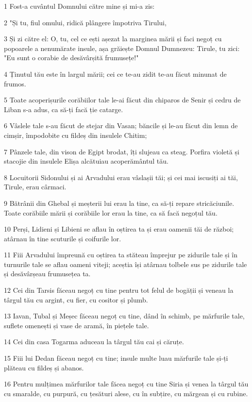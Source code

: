 \par 1 Fost-a cuvântul Domnului către mine și mi-a zis:
\par 2 "Și tu, fiul omului, ridică plângere împotriva Tirului,
\par 3 Și zi către el: O, tu, cel ce ești așezat la marginea mării și faci negoț cu popoarele a nenumărate insule, așa grăiește Domnul Dumnezeu: Tirule, tu zici: "Eu sunt o corabie de desăvârșită frumusețe!"
\par 4 Ținutul tău este în largul mării; cei ce te-au zidit te-au făcut minunat de frumos.
\par 5 Toate acoperișurile corăbiilor tale le-ai făcut din chiparos de Senir și cedru de Liban s-a adus, ca să-ți facă ție catarge.
\par 6 Vâslele tale s-au făcut de stejar din Vasan; băncile și le-au făcut din lemn de cimșir, împodobite cu fildeș din insulele Chitim;
\par 7 Pânzele tale, din vison de Egipt brodat, îți slujeau ca steag. Porfira violetă și stacojie din insulele Elișa alcătuiau acoperământul tău.
\par 8 Locuitorii Sidonului și ai Arvadului erau vâslașii tăi; și cei mai iscusiți ai tăi, Tirule, erau cârmaci.
\par 9 Bătrânii din Ghebal și meșterii lui erau la tine, ca să-ți repare stricăciunile. Toate corăbiile mării și corăbiile lor erau la tine, ca să facă negoțul tău.
\par 10 Perși, Lidieni și Libieni se aflau în oștirea ta și erau oamenii tăi de război; atârnau în tine scuturile și coifurile lor.
\par 11 Fiii Arvadului împreună cu oștirea ta stăteau împrejur pe zidurile tale și în turnurile tale se aflau oameni viteji; aceștia își atârnau tolbele sus pe zidurile tale și desăvârșeau frumusețea ta.
\par 12 Cei din Tarsis făceau negoț cu tine pentru tot felul de bogății și veneau la târgul tău cu argint, cu fier, cu cositor și plumb.
\par 13 Iavan, Tubal și Meșec făceau negoț cu tine, dând în schimb, pe mărfurile tale, suflete omenești și vase de aramă, în piețele tale.
\par 14 Cei din casa Togarma aduceau la târgul tău cai și căruțe.
\par 15 Fiii lui Dedan făceau negoț cu tine; insule multe luau mărfurile tale și-ți plăteau cu fildeș și abanos.
\par 16 Pentru mulțimea mărfurilor tale făcea negoț cu tine Siria și venea la târgul tău cu smaralde, cu purpură, cu țesături alese, cu în subțire, cu mărgean și cu rubine.
